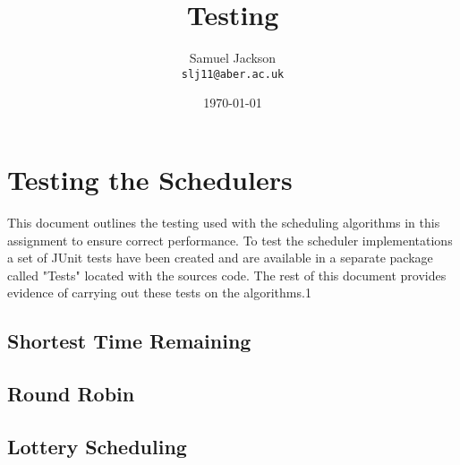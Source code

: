 \documentclass{article}
\begin{document}
\title{Testing}
\author{Samuel Jackson \\ \texttt{slj11@aber.ac.uk}}
\date{\today}
\maketitle

\newpage
\section{Testing the Schedulers}
This document outlines the testing used with the scheduling algorithms in this assignment to ensure correct performance. To test the scheduler implementations a set of JUnit tests have been created and are available in a separate package called "Tests" located with the sources code. The rest of this document provides evidence of carrying out these tests on the algorithms.1
\subsection{Shortest Time Remaining}
\subsection{Round Robin}
\subsection{Lottery Scheduling}
\end{document}
